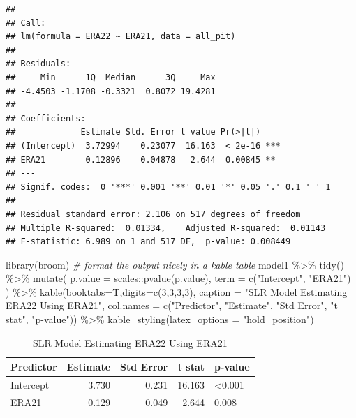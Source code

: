 \documentclass[
  11pt,
]{book}
\newenvironment{Shaded}{\begin{snugshade}}{\end{snugshade}}
\newcommand{\AttributeTok}[1]{\textcolor[rgb]{0.77,0.63,0.00}{#1}}
\newcommand{\CommentTok}[1]{\textcolor[rgb]{0.56,0.35,0.01}{\textit{#1}}}
\newcommand{\DecValTok}[1]{\textcolor[rgb]{0.00,0.00,0.81}{#1}}
\newcommand{\FunctionTok}[1]{\textcolor[rgb]{0.00,0.00,0.00}{#1}}
\newcommand{\NormalTok}[1]{#1}
\newcommand{\SpecialCharTok}[1]{\textcolor[rgb]{0.00,0.00,0.00}{#1}}
\newcommand{\StringTok}[1]{\textcolor[rgb]{0.31,0.60,0.02}{#1}}
\theoremstyle{definition}
\theoremstyle{definition}
\theoremstyle{definition}
\theoremstyle{definition}
\theoremstyle{remark}
\begin{document}
\begin{verbatim}
## 
## Call:
## lm(formula = ERA22 ~ ERA21, data = all_pit)
## 
## Residuals:
##     Min      1Q  Median      3Q     Max 
## -4.4503 -1.1708 -0.3321  0.8072 19.4281 
## 
## Coefficients:
##             Estimate Std. Error t value Pr(>|t|)    
## (Intercept)  3.72994    0.23077  16.163  < 2e-16 ***
## ERA21        0.12896    0.04878   2.644  0.00845 ** 
## ---
## Signif. codes:  0 '***' 0.001 '**' 0.01 '*' 0.05 '.' 0.1 ' ' 1
## 
## Residual standard error: 2.106 on 517 degrees of freedom
## Multiple R-squared:  0.01334,    Adjusted R-squared:  0.01143 
## F-statistic: 6.989 on 1 and 517 DF,  p-value: 0.008449
\end{verbatim}

\begin{Shaded}
\begin{Highlighting}[]
\FunctionTok{library}\NormalTok{(broom)}
\CommentTok{\# format the output nicely in a kable table}
\NormalTok{model1 }\SpecialCharTok{\%\textgreater{}\%} \FunctionTok{tidy}\NormalTok{() }\SpecialCharTok{\%\textgreater{}\%}
  \FunctionTok{mutate}\NormalTok{(}
    \AttributeTok{p.value =}\NormalTok{ scales}\SpecialCharTok{::}\FunctionTok{pvalue}\NormalTok{(p.value),}
    \AttributeTok{term =} \FunctionTok{c}\NormalTok{(}\StringTok{"Intercept"}\NormalTok{, }\StringTok{"ERA21"}\NormalTok{)}
\NormalTok{  ) }\SpecialCharTok{\%\textgreater{}\%}
  \FunctionTok{kable}\NormalTok{(}\AttributeTok{booktabs=}\NormalTok{T,}\AttributeTok{digits=}\FunctionTok{c}\NormalTok{(}\DecValTok{3}\NormalTok{,}\DecValTok{3}\NormalTok{,}\DecValTok{3}\NormalTok{,}\DecValTok{3}\NormalTok{), }
        \AttributeTok{caption =} \StringTok{"SLR Model Estimating ERA22 Using ERA21"}\NormalTok{,}
        \AttributeTok{col.names =} \FunctionTok{c}\NormalTok{(}\StringTok{"Predictor"}\NormalTok{, }\StringTok{"Estimate"}\NormalTok{, }\StringTok{"Std Error"}\NormalTok{, }\StringTok{"t stat"}\NormalTok{, }\StringTok{"p{-}value"}\NormalTok{)) }\SpecialCharTok{\%\textgreater{}\%}
  \FunctionTok{kable\_styling}\NormalTok{(}\AttributeTok{latex\_options =} \StringTok{"hold\_position"}\NormalTok{)}
\end{Highlighting}
\end{Shaded}

\begin{table}[!h]

\caption{\label{tab:unnamed-chunk-220}SLR Model Estimating ERA22 Using ERA21}
\centering
\begin{tabular}[t]{lrrrl}
\toprule
Predictor & Estimate & Std Error & t stat & p-value\\
\midrule
Intercept & 3.730 & 0.231 & 16.163 & <0.001\\
ERA21 & 0.129 & 0.049 & 2.644 & 0.008\\
\bottomrule
\end{tabular}
\end{table}
\end{document}
